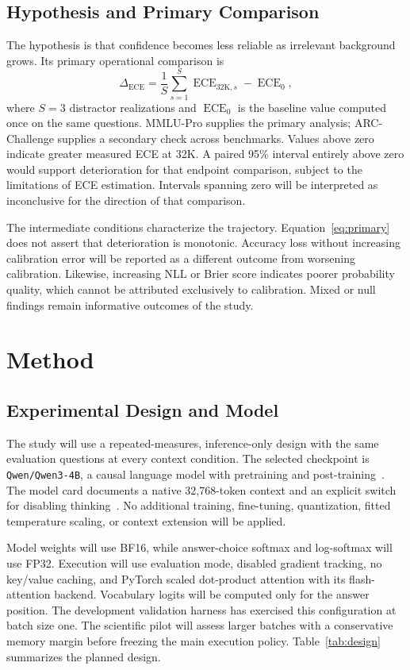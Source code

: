 \documentclass[conference]{IEEEtran}
\newcommand{\ECE}{\operatorname{ECE}}
\begin{document}
\subsection{Hypothesis and Primary Comparison}
The hypothesis is that confidence becomes less reliable as irrelevant background grows. Its primary operational comparison is
\begin{equation}
\Delta_{\ECE} = \frac{1}{S}\sum_{s=1}^{S}\ECE_{32\mathrm{K},s}-\ECE_{0},
\label{eq:primary}
\end{equation}
where $S=3$ distractor realizations and $\ECE_0$ is the baseline value computed once on the same questions. MMLU-Pro supplies the primary analysis; ARC-Challenge supplies a secondary check across benchmarks. Values above zero indicate greater measured ECE at 32K. A paired 95\% interval entirely above zero would support deterioration for that endpoint comparison, subject to the limitations of ECE estimation. Intervals spanning zero will be interpreted as inconclusive for the direction of that comparison.

The intermediate conditions characterize the trajectory. Equation~\eqref{eq:primary} does not assert that deterioration is monotonic. Accuracy loss without increasing calibration error will be reported as a different outcome from worsening calibration. Likewise, increasing NLL or Brier score indicates poorer probability quality, which cannot be attributed exclusively to calibration. Mixed or null findings remain informative outcomes of the study.

\section{Method}
\subsection{Experimental Design and Model}
The study will use a repeated-measures, inference-only design with the same evaluation questions at every context condition. The selected checkpoint is \texttt{Qwen/Qwen3-4B}, a causal language model with pretraining and post-training~\cite{qwen2025}. The model card documents a native 32,768-token context and an explicit switch for disabling thinking~\cite{qwencard}. No additional training, fine-tuning, quantization, fitted temperature scaling, or context extension will be applied.

Model weights will use BF16, while answer-choice softmax and log-softmax will use FP32. Execution will use evaluation mode, disabled gradient tracking, no key/value caching, and PyTorch scaled dot-product attention with its flash-attention backend. Vocabulary logits will be computed only for the answer position. The development validation harness has exercised this configuration at batch size one. The scientific pilot will assess larger batches with a conservative memory margin before freezing the main execution policy. Table~\ref{tab:design} summarizes the planned design.
\end{document}
